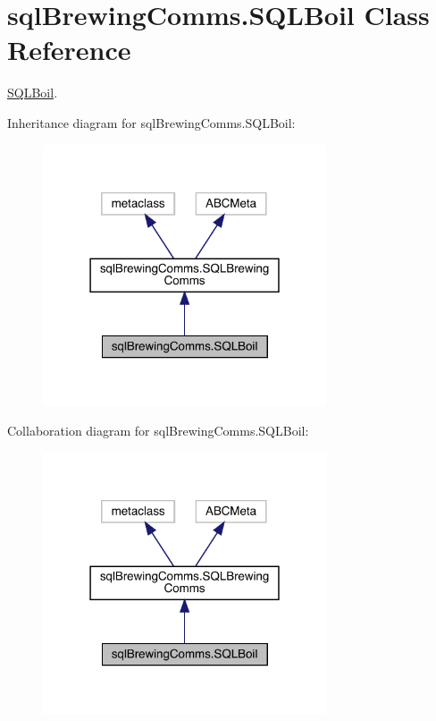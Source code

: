 \hypertarget{classsql_brewing_comms_1_1_s_q_l_boil}{}\section{sql\+Brewing\+Comms.\+S\+Q\+L\+Boil Class Reference}
\label{classsql_brewing_comms_1_1_s_q_l_boil}


\mbox{\hyperlink{classsql_brewing_comms_1_1_s_q_l_boil}{S\+Q\+L\+Boil}}.  




Inheritance diagram for sql\+Brewing\+Comms.\+S\+Q\+L\+Boil\+:\nopagebreak
\begin{figure}[H]
\begin{center}
\leavevmode
\includegraphics[width=238pt]{classsql_brewing_comms_1_1_s_q_l_boil__inherit__graph}
\end{center}
\end{figure}


Collaboration diagram for sql\+Brewing\+Comms.\+S\+Q\+L\+Boil\+:\nopagebreak
\begin{figure}[H]
\begin{center}
\leavevmode
\includegraphics[width=238pt]{classsql_brewing_comms_1_1_s_q_l_boil__coll__graph}
\end{center}
\end{figure}
